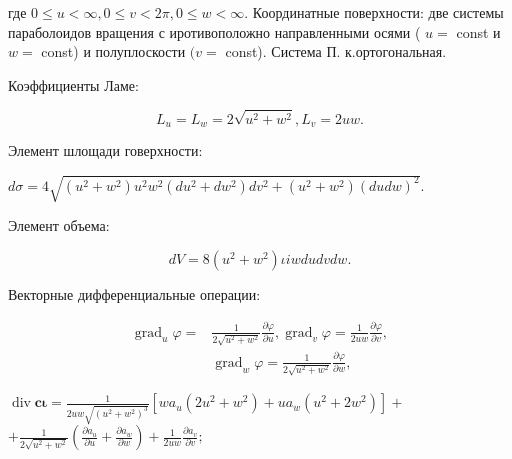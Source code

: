 \documentclass[10pt]{article}
\begin{document}
где $0 \leqslant u<\infty, 0 \leqslant v<2 \pi, 0 \leqslant w<\infty$. Координатные поверхности: две системы параболоидов вращения с иротивоположно направленными осями ( $u=$ const и $w=$ const) и полуплоскости $(v=$ const). Система П. к.ортогональная.



Коэффициенты Ламе:



\[

L_{u}=L_{w}=2 \sqrt{u^{2}+w^{2}}, L_{v}=2 u w .

\]



Элемент шлощади говерхности:



$d \sigma=4 \sqrt{\left(u^{2}+w^{2}\right) u^{2} w^{2}\left(d u^{2}+d w^{2}\right) d v^{2}+\left(u^{2}+w^{2}\right)(d u d w)^{2}}$.



Элемент объема:



\[

d V=8\left(u^{2}+w^{2}\right) \iota i w d u d v d w .

\]



Векторные дифференциальные операции:



\[

\begin{aligned}

\operatorname{grad}_{u} \varphi= & \frac{1}{2 \sqrt{u^{2}+w^{2}}} \frac{\partial \varphi}{\partial u}, \operatorname{grad}_{v} \varphi=\frac{1}{2 u w} \frac{\partial \varphi}{\partial v}, \\

& \operatorname{grad}_{w} \varphi=\frac{1}{2 \sqrt{u^{2}+w^{2}}} \frac{\partial \varphi}{\partial w},

\end{aligned}

\]



$\operatorname{div} \boldsymbol{c} \boldsymbol{\iota}=\frac{1}{2 u w \sqrt{\left(u^{2}+w^{2}\right)^{3}}}\left[w a_{u}\left(2 u^{2}+w^{2}\right)+u a_{w}\left(u^{2}+2 w^{2}\right)\right]+$ $+\frac{1}{2 \sqrt{u^{2}+w^{2}}}\left(\frac{\partial a_{u}}{\partial u}+\frac{\partial a_{w}}{\partial w}\right)+\frac{1}{2 u w} \frac{\partial a_{v}}{\partial v} ;$
\end{document}
